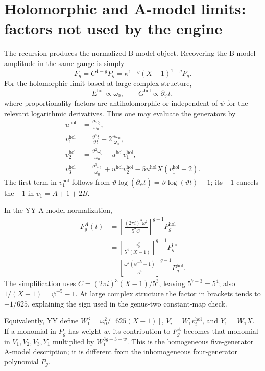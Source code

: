 \documentclass[11pt,a4paper]{article}
\numberwithin{equation}{section}
\newcommand{\tht}{\vartheta}
\newcommand{\del}{\partial}
\newcommand{\hol}{\mathrm{hol}}
\begin{document}
\section{Holomorphic and A-model limits: factors not used by the engine}
\label{sec:amodel}

The recursion produces the normalized B-model object. Recovering the
B-model amplitude in the same gauge is simply
\begin{equation}
F_g=C^{1-g}P_g=\kappa^{1-g}(X-1)^{1-g}P_g.
\end{equation}
For the holomorphic limit based at large complex structure,
\begin{equation}
E^{\hol}\propto\omega_0,\qquad
G^{\hol}\propto\del_\psi t,
\end{equation}
where proportionality factors are antiholomorphic or independent of $\psi$
for the relevant logarithmic derivatives. Thus one may evaluate the generators by
\begin{align}
u^{\hol}&=\frac{\tht\omega_0}{\omega_0},\\
v_1^{\hol}&=\frac{\tht^2t}{\tht t}
                   +2\frac{\tht\omega_0}{\omega_0},\\
v_2^{\hol}&=\frac{\tht^2\omega_0}{\omega_0}-u^{\hol}v_1^{\hol},\\
v_3^{\hol}&=\frac{\tht^3\omega_0}{\omega_0}
                   +u^{\hol}v_2^{\hol}-5u^{\hol}X(v_1^{\hol}-2).
\end{align}
The first term in $v_1^{\hol}$ follows from
$\tht\log(\del_\psi t)=\tht\log(\tht t)-1$; its $-1$
cancels the $+1$ in $v_1=A+1+2B$.

In the YY A-model normalization,
\begin{align}
F_g^A(t)&=\left[\frac{(2\pi i)^3\omega_0^2}{5^7C}\right]^{g-1}
                    P_g^{\hol}\\
 &=\left[\frac{\omega_0^2}{5^4(X-1)}\right]^{g-1}P_g^{\hol}\\
 &=\left[\frac{\omega_0^2(\psi^{-5}-1)}{5^4}\right]^{g-1}P_g^{\hol}.
\end{align}
The simplification uses $C=(2\pi i)^3(X-1)/5^3$, leaving $5^{7-3}=5^4$;
also $1/(X-1)=\psi^{-5}-1$. At large complex structure the factor
in brackets tends to $-1/625$, explaining the sign used in the genus-two
constant-map check.

Equivalently, YY define $W_1^3=\omega_0^2/[625(X-1)]$,
$V_i=W_1^i v_i^{\hol}$, and $Y_1=W_1X$. If a monomial in $P_g$
has weight $w$, its contribution to $F_g^A$ becomes that monomial in
$V_1,V_2,V_3,Y_1$ multiplied by $W_1^{3g-3-w}$.
This is the homogeneous five-generator A-model description; it is different
from the inhomogeneous four-generator polynomial $P_g$.
\end{document}
